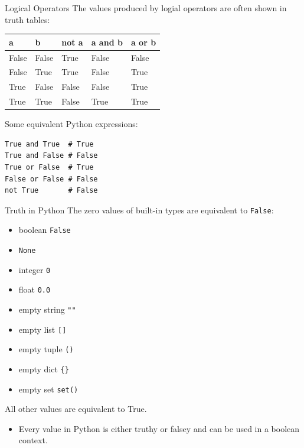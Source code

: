 \documentclass[smaller, aspectratio=1610]{beamer}
\begin{document}
\begin{frame}[label={sec:org621c3c0},fragile]{Logical Operators}
 The values produced by logial operators are often shown in truth tables:

\begin{center}
\begin{tabular}{|l|l|l|l|l|}
\hline
a & b & not a & a and b & a or b \\
\hline
False & False & True & False & False \\
False & True & True & False & True \\
True & False & False & False & True \\
True & True & False & True & True \\
\hline
\end{tabular}
\end{center}

Some equivalent Python expressions:

\lstset{language=Python,label= ,caption= ,captionpos=b,numbers=none}
\begin{lstlisting}
True and True  # True
True and False # False
True or False  # True
False or False # False
not True       # False
\end{lstlisting}
\end{frame}

\begin{frame}[label={sec:orga74eeaa},fragile]{Truth in Python}
 The zero values of built-in types are equivalent to \texttt{False}:

\begin{itemize}
\item boolean \texttt{False}
\item \texttt{None}
\item integer \texttt{0}
\item float \texttt{0.0}
\item empty string \texttt{""}
\item empty list \texttt{[]}
\item empty tuple \texttt{()}
\item empty dict \texttt{\{\}}
\item empty set \texttt{set()}
\end{itemize}

All other values are equivalent to True.

\begin{itemize}
\item Every value in Python is either \alert{truthy} or \alert{falsey} and can be used in a boolean context.
\end{itemize}
\end{frame}
\end{document}
